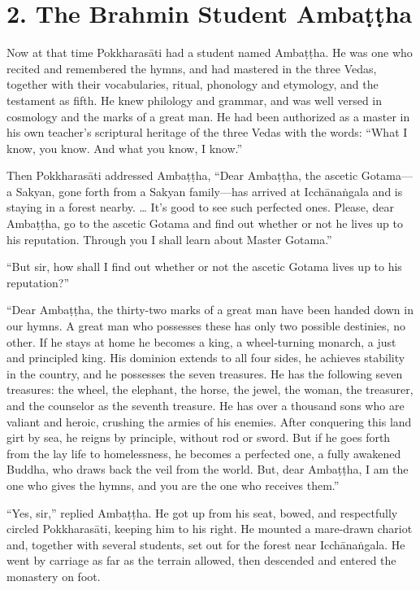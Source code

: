 \documentclass[12pt,openany]{book}%
\begin{document}
\section*{2. The Brahmin Student \textsanskrit{Ambaṭṭha} }

Now at that time \textsanskrit{Pokkharasāti} had a student named \textsanskrit{Ambaṭṭha}. He was one who recited and remembered the hymns, and had mastered in the three Vedas, together with their vocabularies, ritual, phonology and etymology, and the testament as fifth. He knew philology and grammar, and was well versed in cosmology and the marks of a great man. He had been authorized as a master in his own teacher’s scriptural heritage of the three Vedas with the words: “What I know, you know. And what you know, I know.” 

Then \textsanskrit{Pokkharasāti} addressed \textsanskrit{Ambaṭṭha}, “Dear \textsanskrit{Ambaṭṭha}, the ascetic Gotama—a Sakyan, gone forth from a Sakyan family—has arrived at \textsanskrit{Icchānaṅgala} and is staying in a forest nearby. … It’s good to see such perfected ones. Please, dear \textsanskrit{Ambaṭṭha}, go to the ascetic Gotama and find out whether or not he lives up to his reputation. Through you I shall learn about Master Gotama.” 

“But sir, how shall I find out whether or not the ascetic Gotama lives up to his reputation?” 

“Dear \textsanskrit{Ambaṭṭha}, the thirty-two marks of a great man have been handed down in our hymns. A great man who possesses these has only two possible destinies, no other. If he stays at home he becomes a king, a wheel-turning monarch, a just and principled king. His dominion extends to all four sides, he achieves stability in the country, and he possesses the seven treasures. He has the following seven treasures: the wheel, the elephant, the horse, the jewel, the woman, the treasurer, and the counselor as the seventh treasure. He has over a thousand sons who are valiant and heroic, crushing the armies of his enemies. After conquering this land girt by sea, he reigns by principle, without rod or sword. But if he goes forth from the lay life to homelessness, he becomes a perfected one, a fully awakened Buddha, who draws back the veil from the world. But, dear \textsanskrit{Ambaṭṭha}, I am the one who gives the hymns, and you are the one who receives them.” 

“Yes, sir,” replied \textsanskrit{Ambaṭṭha}. He got up from his seat, bowed, and respectfully circled \textsanskrit{Pokkharasāti}, keeping him to his right. He mounted a mare-drawn chariot and, together with several students, set out for the forest near \textsanskrit{Icchānaṅgala}. He went by carriage as far as the terrain allowed, then descended and entered the monastery on foot. 
\end{document}
